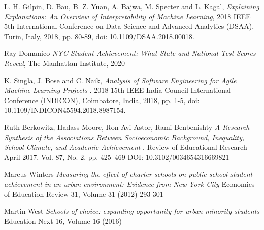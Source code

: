 \documentclass[sigconf,nonacm,11pt]{acmart}
\begin{document}
\begin{thebibliography}{9}
L. H. Gilpin, D. Bau, B. Z. Yuan, A. Bajwa, M. Specter and L. Kagal, 
\textit{Explaining Explanations: An Overview of Interpretability of Machine Learning}, 2018 IEEE 5th International Conference on Data Science and Advanced Analytics (DSAA), Turin, Italy, 2018, pp. 80-89, doi: 10.1109/DSAA.2018.00018.


Ray Domanico
\textit{NYC Student Achievement: What State and National Test Scores Reveal}, 
The Manhattan Institute, 2020

K. Singla, J. Bose and C. Naik, 
\textit{Analysis of Software Engineering for Agile Machine Learning Projects }.
2018 15th IEEE India Council International Conference (INDICON), Coimbatore, India, 2018, pp. 1-5, doi: 10.1109/INDICON45594.2018.8987154.

Ruth Berkowitz, Hadass Moore, Ron Avi Astor, Rami Benbenishty
\textit{A Research Synthesis of the Associations Between Socioeconomic Background, Inequality, School Climate, and Academic Achievement }.
Review of Educational Research April 2017, Vol. 87, No. 2, pp. 425–469 DOI: 10.3102/0034654316669821

Marcus Winters
\textit{Measuring the effect of charter schools on public school student achievement in an urban environment: Evidence from New York City}
Economics of Education Review 31, Volume 31 (2012) 293-301

Martin West
\textit{Schools of choice: expanding opportunity for urban minority students}
Education Next 16, Volume 16 (2016)

\end{thebibliography}



\end{document}
